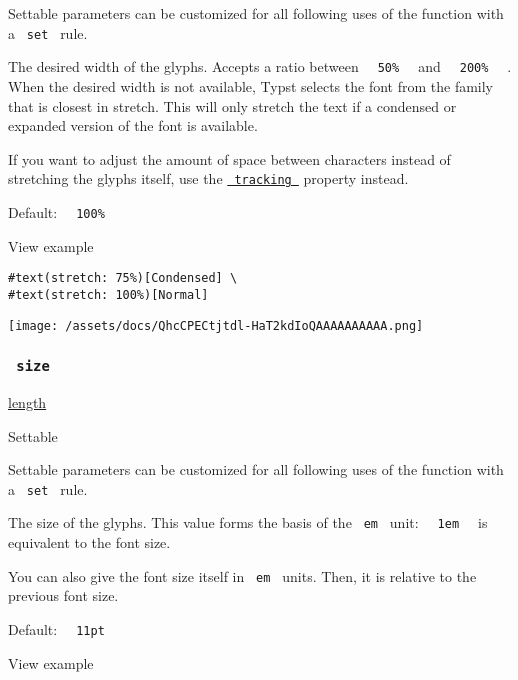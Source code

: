\label{parameters-stretch-settable-tooltip}
Settable parameters can be customized for all following uses of the
function with a \texttt{\ set\ } rule.

The desired width of the glyphs. Accepts a ratio between
\texttt{\ }{\texttt{\ 50\%\ }}\texttt{\ } and
\texttt{\ }{\texttt{\ 200\%\ }}\texttt{\ } . When the desired width is
not available, Typst selects the font from the family that is closest in
stretch. This will only stretch the text if a condensed or expanded
version of the font is available.

If you want to adjust the amount of space between characters instead of
stretching the glyphs itself, use the
\href{/docs/reference/text/text/\#parameters-tracking}{\texttt{\ tracking\ }}
property instead.

Default: \texttt{\ }{\texttt{\ 100\%\ }}\texttt{\ }


View example

\begin{verbatim}
#text(stretch: 75%)[Condensed] \
#text(stretch: 100%)[Normal]
\end{verbatim}

\texttt{[image: /assets/docs/QhcCPECtjtdl-HaT2kdIoQAAAAAAAAAA.png]}

\subsubsection{\texorpdfstring{\texttt{\ size\ }}{ size }}\label{parameters-size}

\href{/docs/reference/layout/length/}{length}

{{ Settable }}

\label{parameters-size-settable-tooltip}
Settable parameters can be customized for all following uses of the
function with a \texttt{\ set\ } rule.

The size of the glyphs. This value forms the basis of the
\texttt{\ em\ } unit: \texttt{\ }{\texttt{\ 1em\ }}\texttt{\ } is
equivalent to the font size.

You can also give the font size itself in \texttt{\ em\ } units. Then,
it is relative to the previous font size.

Default: \texttt{\ }{\texttt{\ 11pt\ }}\texttt{\ }


View example

